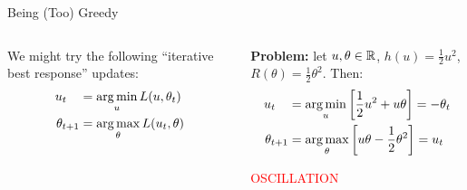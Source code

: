 \documentclass[final]{beamer}
\begin{document}
\begin{frame}{}
\begin{columns}
\begin{column}{0.46\linewidth}
\begin{block}{\large Being (Too) Greedy}
\begin{columns}[t]
\begin{column}{.48\linewidth}
We might try the following ``iterative best response'' updates:
\begin{align*}
u_t\,\,\,\,\,\, &= \argmin_{u} L(u,\theta_t) \\
\theta_{t+1}   &= \argmax_{\theta} L(u_t, \theta)
\end{align*}
\end{column}
\begin{column}{.48\linewidth}
{\bf Problem:} let $u,\theta \in \mathbb{R}$, $h(u) = \frac{1}{2}u^2$, $R(\theta) = \frac{1}{2}\theta^2$. 
Then:
\begin{align*}
u_t\,\,\,\,\,\, &= \argmin_u \left[\frac{1}{2}u^2 + u\theta\right]             = -\theta_t \\
\theta_{t+1}    &= \argmax_{\theta} \left[u\theta - \frac{1}{2}\theta^2\right] = u_t
\end{align*}
\begin{center}
\textcolor{red}{OSCILLATION}
\end{center}
\end{column}
\end{columns}
\end{block}


\end{column}
\end{columns}
\end{frame}
\end{document}
